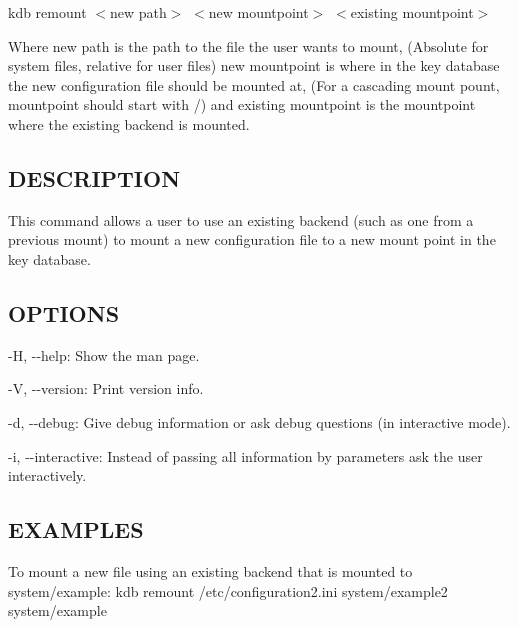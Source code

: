 {\ttfamily kdb remount $<$new path$>$ $<$new mountpoint$>$ $<$existing mountpoint$>$}

Where {\ttfamily new path} is the path to the file the user wants to mount, (Absolute for system files, relative for user files) {\ttfamily new mountpoint} is where in the key database the new configuration file should be mounted at, (For a cascading mount pount, {\ttfamily mountpoint} should start with {\ttfamily /}) and {\ttfamily existing mountpoint} is the mountpoint where the existing backend is mounted.

\subsection*{D\+E\+S\+C\+R\+I\+P\+T\+I\+O\+N}

This command allows a user to use an existing backend (such as one from a previous mount) to mount a new configuration file to a new mount point in the key database.

\subsection*{O\+P\+T\+I\+O\+N\+S}


\begin{DoxyItemize}
\item {\ttfamily -\/\+H}, {\ttfamily -\/-\/help}\+: Show the man page.
\item {\ttfamily -\/\+V}, {\ttfamily -\/-\/version}\+: Print version info.
\item {\ttfamily -\/d}, {\ttfamily -\/-\/debug}\+: Give debug information or ask debug questions (in interactive mode).
\item {\ttfamily -\/i}, {\ttfamily -\/-\/interactive}\+: Instead of passing all information by parameters ask the user interactively.
\end{DoxyItemize}

\subsection*{E\+X\+A\+M\+P\+L\+E\+S}

To mount a new file using an existing backend that is mounted to {\ttfamily system/example}\+: {\ttfamily kdb remount /etc/configuration2.ini system/example2 system/example} 
